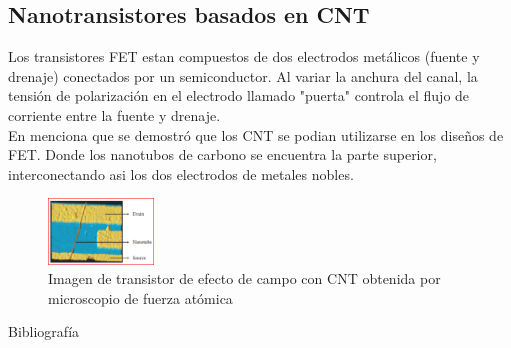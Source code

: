 \documentclass[aspectratio=169, 8pt]{beamer}
\begin{document}
	\subsection{Nanotransistores basados en CNT}
	\begin{frame}
		Los transistores FET estan compuestos de dos electrodos metálicos (fuente y drenaje) conectados por un semiconductor. Al variar la anchura del canal, la tensión de polarización en el electrodo llamado "puerta" controla el flujo de corriente entre la fuente y drenaje.\\
		
		En \cite{3} menciona que se demostró que los CNT se podian utilizarse en los diseños de FET. Donde los nanotubos de carbono se encuentra la parte superior, interconectando asi los dos electrodos de metales nobles.
		\begin{figure}[!ht] 
			\centering
			\includegraphics[width=0.25\textwidth]{IMAGENES/3.PNG}
			\caption{Imagen de transistor de efecto de campo con CNT obtenida por microscopio de fuerza atómica  \cite{3}}
			\label{f_3}
		\end{figure}
		
		
	\end{frame}
	
	\begin{frame}{Bibliografía}
		
		
	\end{frame}
	
\end{document}
